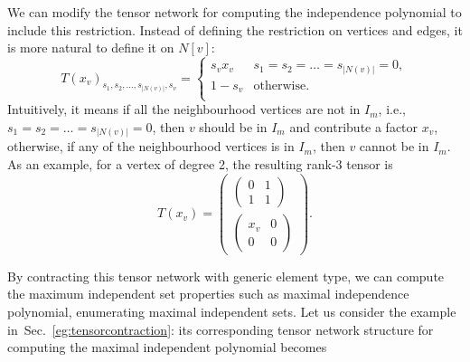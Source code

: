 \documentclass[onefignum, onetabnum]{siamart190516}
\newcommand{\<}{\langle}
\renewcommand{\>}{\rangle}
\newcommand{\Sec}[1]{Sec.~\ref{#1}}
\newcounter{example}
\begin{document}
We can modify the tensor network for computing the independence polynomial to include this restriction. Instead of defining the restriction on vertices and edges, it is more natural to define it on $N[v]$:
\begin{equation}\label{eq:maximal}
    T(x_v)_{s_1,s_2,\ldots,s_{|N(v)|},s_v} = \begin{cases}
        s_vx_v & s_1=s_2=\ldots=s_{|N(v)|}=0,\\
        1-s_v& \text{otherwise}.\\
    \end{cases}
\end{equation}
Intuitively, it means if all the neighbourhood vertices are not in $I_{m}$, i.e., $ s_1=s_2=\ldots=s_{|N(v)|}=0$, then $v$ should be in $I_{m}$ and contribute a factor $x_{v}$,
otherwise, if any of the neighbourhood vertices is in $I_{m}$, then $v$ cannot be in $I_{m}$.
As an example, for a vertex of degree 2, the resulting rank-3 tensor is
\begin{equation}
    T(x_v)=\left(\begin{matrix}
    \left(\begin{matrix}
        0 &1 \\
        1 &1
    \end{matrix}\right)\\
    \left(\begin{matrix}
        x_v &0 \\
        0 &0
    \end{matrix}\right)
    \end{matrix}\right).
\end{equation}
 
By contracting this tensor network with generic element type,
we can compute the maximum independent set properties such as maximal independence polynomial, enumerating maximal independent sets.
Let us consider the example in~\Sec{eg:tensorcontraction}: its corresponding tensor network structure for computing the maximal independent polynomial becomes
\end{document}
